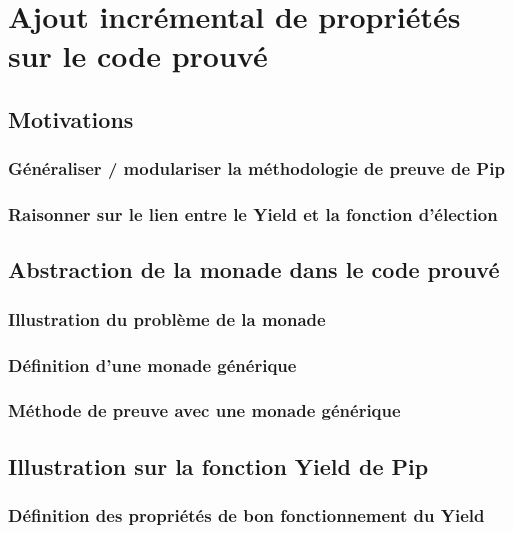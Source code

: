 \chapter{Ajout incrémental de propriétés sur le code prouvé}

	\section{Motivations}
		\subsection{Généraliser / modulariser la méthodologie de preuve de Pip}

		\subsection{Raisonner sur le lien entre le Yield et la fonction d'élection}
	

	\section{Abstraction de la monade dans le code prouvé}

		\subsection{Illustration du problème de la monade}

		\subsection{Définition d'une monade générique}

		\subsection{Méthode de preuve avec une monade générique}
		
	\section{Illustration sur la fonction Yield de Pip}
		\subsection{Définition des propriétés de bon fonctionnement du Yield}

